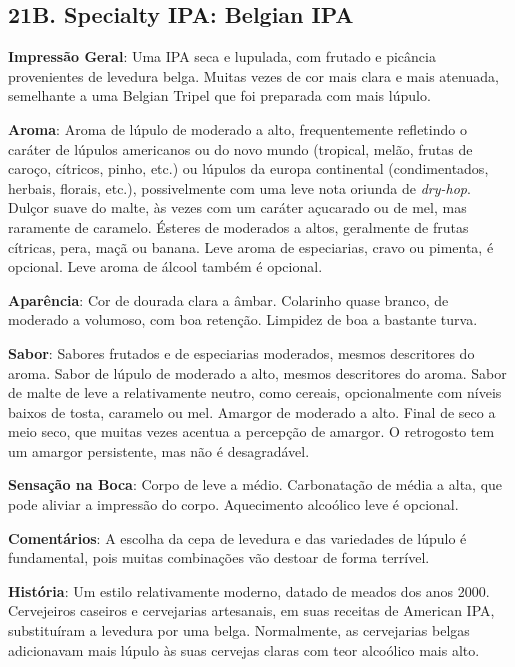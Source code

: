 \subsection*{21B. Specialty IPA: Belgian IPA}
\textbf{Impressão Geral}: Uma IPA seca e lupulada, com frutado e picância provenientes de levedura belga. Muitas vezes de cor mais clara e mais atenuada, semelhante a uma Belgian Tripel que foi preparada com mais lúpulo.

\textbf{Aroma}: Aroma de lúpulo de moderado a alto, frequentemente refletindo o caráter de lúpulos americanos ou do novo mundo (tropical, melão, frutas de caroço, cítricos, pinho, etc.) ou lúpulos da europa continental (condimentados, herbais, florais, etc.), possivelmente com uma leve nota oriunda de \textit{dry-hop}. Dulçor suave do malte, às vezes com um caráter açucarado ou de mel, mas raramente de caramelo. Ésteres de moderados a altos, geralmente de frutas cítricas, pera, maçã ou banana. Leve aroma de especiarias, cravo ou pimenta, é opcional. Leve aroma de álcool também é opcional.

\textbf{Aparência}: Cor de dourada clara a âmbar. Colarinho quase branco, de moderado a volumoso, com boa retenção. Limpidez de boa a bastante turva.

\textbf{Sabor}: Sabores frutados e de especiarias moderados, mesmos descritores do aroma. Sabor de lúpulo de moderado a alto, mesmos descritores do aroma. Sabor de malte de leve a relativamente neutro, como cereais, opcionalmente com níveis baixos de tosta, caramelo ou mel. Amargor de moderado a alto. Final de seco a meio seco, que muitas vezes acentua a percepção de amargor. O retrogosto tem um amargor persistente, mas não é desagradável.

\textbf{Sensação na Boca}: Corpo de leve a médio. Carbonatação de média a alta, que pode aliviar a impressão do corpo. Aquecimento alcoólico leve é opcional.

\textbf{Comentários}: A escolha da cepa de levedura e das variedades de lúpulo é fundamental, pois muitas combinações vão destoar de forma terrível.

\textbf{História}: Um estilo relativamente moderno, datado de meados dos anos 2000. Cervejeiros caseiros e cervejarias artesanais, em suas receitas de American IPA, substituíram a levedura por uma belga. Normalmente, as cervejarias belgas adicionavam mais lúpulo às suas cervejas claras com teor alcoólico mais alto.

